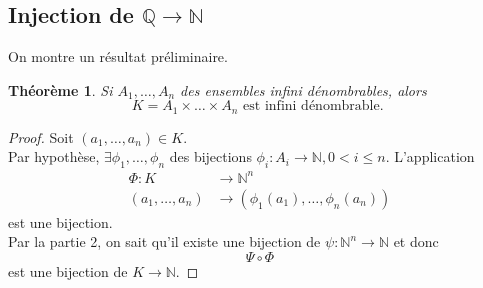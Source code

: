 \documentclass[11pt, a4paper, twoside]{article}
\newtheorem{theorem}{Théorème}
\begin{document}
\subsection*{Injection de $\mathbb{Q} \to \mathbb{N}$}
On montre un résultat préliminaire.\\
\begin{theorem}
Si $ A_1, \ldots, A_n$ des ensembles infini dénombrables, alors
\[ 
K=A_1 \times \ldots \times A_n \text{ est infini dénombrable. } 
\]
\end{theorem}
\begin{proof}
	Soit $(a_1, \ldots, a_n) \in K $.\\
	Par hypothèse, $\exists \phi_1,\ldots, \phi_n$ des bijections $\phi_i: A_i \to \mathbb{N}, 0<i\leq n$.
	L'application
	\begin{align*}
		\Phi: K &\to \mathbb{N}^{n}\\
		( a_1,\ldots, a_n) &\to ( \phi_1(a_1), \ldots, \phi_n(a_n))
	\end{align*}
	est une bijection.\\
	Par la partie 2, on sait qu'il existe une bijection de $\psi: \mathbb{N}^{n} \to \mathbb{N}$ et donc
	\[ 
	\Psi \circ \Phi
	\]
	est une bijection de $K \to \mathbb{N}$.
\end{proof}


\end{document}
